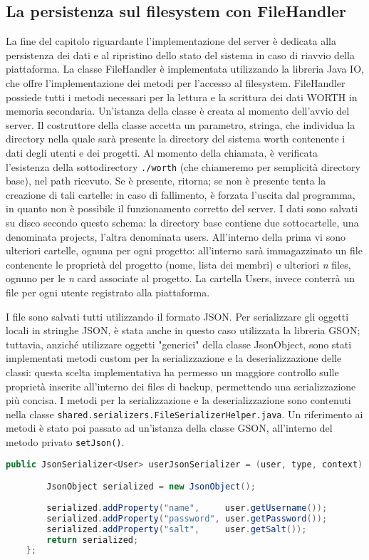 \documentclass{article}
\begin{document}
\subsection{La persistenza sul filesystem con FileHandler}
La fine del capitolo riguardante l'implementazione del server è dedicata alla persistenza dei dati e al ripristino dello stato del sistema in caso di riavvio della piattaforma.
La classe FileHandler è implementata utilizzando la libreria Java IO, che offre l'implementazione dei metodi per l'accesso al filesystem. FileHandler possiede tutti i metodi necessari per la lettura e la scrittura dei dati WORTH in memoria secondaria. Un'istanza della classe è creata al momento dell'avvio del server. Il costruttore della classe accetta un parametro, stringa, che individua la directory nella quale sarà presente la directory del sistema worth contenente i dati degli utenti e dei progetti. Al momento della chiamata, è verificata l'esistenza della sottodirectory \texttt{./worth} (che chiameremo per semplicità directory base), nel path ricevuto. Se è presente, ritorna; se non è presente tenta la creazione di tali cartelle: in caso di fallimento, è forzata l'uscita dal programma, in quanto non è possibile il funzionamento corretto del server.
I dati sono salvati su disco secondo questo schema: la directory base contiene due sottocartelle, una denominata projects, l'altra denominata users. All'interno della prima vi sono ulteriori cartelle, ognuna per ogni progetto: all'interno sarà immagazzinato un file contenente le proprietà del progetto (nome, lista dei membri) e ulteriori \emph n files, ognuno per le \emph n card associate al progetto. La cartella Users, invece conterrà un file per ogni utente registrato alla piattaforma.\newline

I file sono salvati tutti utilizzando il formato JSON. Per serializzare gli oggetti locali in stringhe JSON, è stata anche in questo caso utilizzata la libreria GSON; tuttavia, anziché utilizzare oggetti "generici" della classe JsonObject, sono stati implementati metodi custom per la serializzazione e la deserializzazione delle classi: questa scelta implementativa ha permesso un maggiore controllo sulle proprietà inserite all'interno dei files di backup, permettendo una serializzazione più concisa. I metodi per la serializzazione e la deserializzazione sono contenuti nella classe \texttt{shared.serializers.FileSerializerHelper.java}. Un riferimento ai metodi è stato poi passato ad un'istanza della classe GSON, all'interno del metodo privato \texttt{setJson()}.
\newline
\begin{lstlisting}[language=Java, caption=Esempio di serializzatore per la classe User]
public JsonSerializer<User> userJsonSerializer = (user, type, context) -> {

        JsonObject serialized = new JsonObject();
        
        serialized.addProperty("name",     user.getUsername());
        serialized.addProperty("password", user.getPassword());
        serialized.addProperty("salt",     user.getSalt());
        return serialized;
    };
\end{lstlisting}
\end{document}
